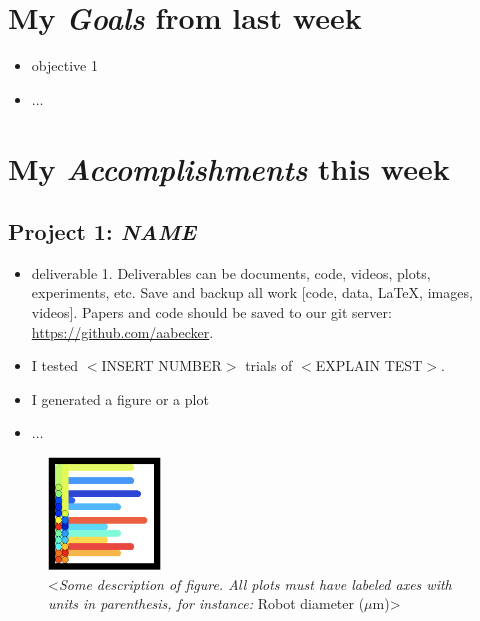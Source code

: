 \newcommand{\handoutName}{Weekly report}
\newcommand{\handoutdate}{\today}
\newcommand{\duedate}{}





\section{My \emph{Goals} from last week}
\begin{itemize}
\item objective 1
\item $\ldots$
\end{itemize}


\section{My \emph{Accomplishments} this week}

\subsection{Project 1: \emph{NAME}}

\begin{itemize}
\item deliverable 1.  Deliverables can be documents, code, videos, plots, experiments, etc.	Save and backup all work [code, data, LaTeX, images, videos].  Papers and code should be saved to our git server: \href{github.com/aabecker}{https://github.com/aabecker}.
\item I tested $<$INSERT NUMBER$>$ trials of $<$EXPLAIN TEST$>$.
\item I generated a figure or a plot
\item $\ldots$
\end{itemize}

\begin{figure}[h]
\begin{center}
\includegraphics[width=3cm]{fig/CovergeSimpleEnd.png}
\caption{<\emph{Some description of figure.  All plots must have labeled axes with units in parenthesis, for instance: } Robot diameter ($\mu$m)>}
\end{center}
\end{figure}


